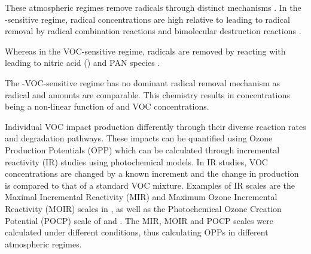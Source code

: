 These atmospheric regimes remove radicals through distinct mechanisms \citep{Kleinman:1991}. 
In the -sensitive regime, radical concentrations are high relative to  leading to radical removal by radical combination reactions  and bimolecular destruction reactions  \citep{Kleinman:1994}.
\vspace{-5mm}
\begin{reactionlist}
\end{reactionlist}
Whereas in the VOC-sensitive regime, radicals are removed by reacting with  leading to nitric acid ()  and PAN species .
\vspace{-3mm}
\begin{reactionlist}
\end{reactionlist}
The -VOC-sensitive regime has no dominant radical removal mechanism as radical and  amounts are comparable.
This chemistry results in  concentrations being a non-linear function of  and VOC concentrations.

Individual VOC impact  production differently through their diverse reaction rates and degradation pathways. 
These impacts can be quantified using Ozone Production Potentials (OPP) which can be calculated through incremental reactivity (IR) studies using photochemical models. 
In IR studies, VOC concentrations are changed by a known increment and the change in  production is compared to that of a standard VOC mixture. 
Examples of IR scales are the Maximal Incremental Reactivity (MIR) and Maximum Ozone Incremental Reactivity (MOIR) scales in \citet{Carter:1994}, as well as the Photochemical Ozone Creation Potential (POCP) scale of \citet{Derwent:1996} and \citet{Derwent:1998}. 
The MIR, MOIR and POCP scales were calculated under different  conditions, thus calculating OPPs in different atmospheric regimes.

